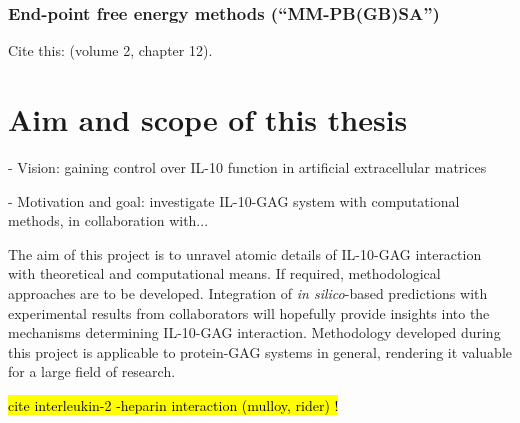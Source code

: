\lipsum[1-5]

\subsubsection{End-point free energy methods (\enquote{MM-PB(GB)SA})}
\label{methods:mmpbsa_mmgbsa}


Cite this: \cite{schlick_innovationsdynamics_2012} (volume 2, chapter 12).

\lipsum[1-5]




\section{Aim and scope of this thesis}

- Vision: gaining control over IL-10 function in artificial extracellular matrices

- Motivation and goal: investigate IL-10-GAG system with computational
      methods, in collaboration with...

The aim of this project is to unravel atomic details of IL-10-GAG interaction
with theoretical and computational means. If required, methodological approaches
are to be developed. Integration of \textit{in silico}-based predictions with
experimental results from collaborators will hopefully provide insights into the
mechanisms determining IL-10-GAG interaction. Methodology developed during this
project is applicable to protein-GAG systems in general, rendering it valuable
for a large field of research.



\hl{cite interleukin-2 -heparin interaction (mulloy, rider) !}

\lipsum[1-5]





